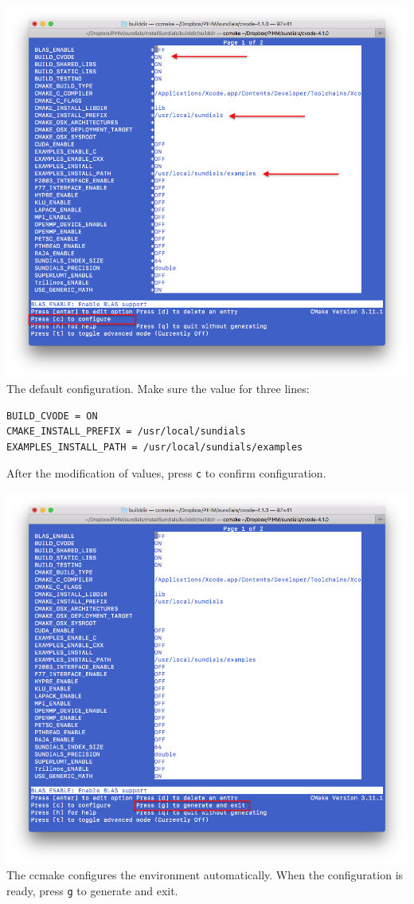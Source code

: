 \documentclass[]{scrbook}
\begin{document}
\includegraphics{Fig/ccmake/2.png} The default configuration. Make sure
the value for three lines:

\begin{verbatim}
BUILD_CVODE = ON
CMAKE_INSTALL_PREFIX = /usr/local/sundials
EXAMPLES_INSTALL_PATH = /usr/local/sundials/examples
\end{verbatim}

After the modification of values, press \texttt{c} to confirm
configuration.

\includegraphics{Fig/ccmake/3.png} The ccmake configures the environment
automatically. When the configuration is ready, press \texttt{g} to
generate and exit.
\end{document}
